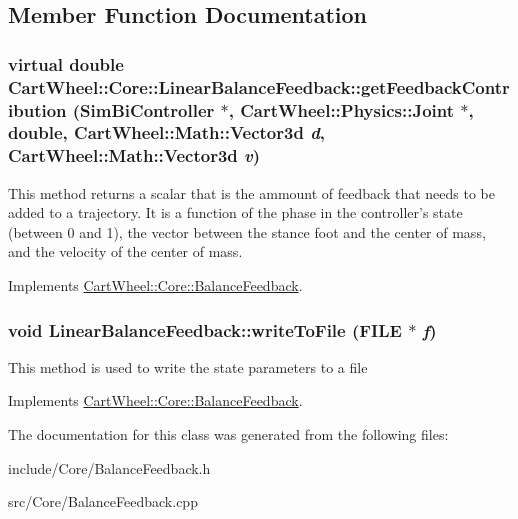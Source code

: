 \subsection{Member Function Documentation}
\hypertarget{classCartWheel_1_1Core_1_1LinearBalanceFeedback_a628981fc632cb32cde15da207f1320e5}{
\subsubsection[{getFeedbackContribution}]{\setlength{\rightskip}{0pt plus 5cm}virtual double CartWheel::Core::LinearBalanceFeedback::getFeedbackContribution ({\bf SimBiController} $\ast$, \/  {\bf CartWheel::Physics::Joint} $\ast$, \/  double, \/  {\bf CartWheel::Math::Vector3d} {\em d}, \/  {\bf CartWheel::Math::Vector3d} {\em v})}}
\label{classCartWheel_1_1Core_1_1LinearBalanceFeedback_a628981fc632cb32cde15da207f1320e5}
This method returns a scalar that is the ammount of feedback that needs to be added to a trajectory. It is a function of the phase in the controller's state (between 0 and 1), the vector between the stance foot and the center of mass, and the velocity of the center of mass. 

Implements \hyperlink{classCartWheel_1_1Core_1_1BalanceFeedback_aa76a657676cd048cecfcd7963beb35cb}{CartWheel::Core::BalanceFeedback}.

\hypertarget{classCartWheel_1_1Core_1_1LinearBalanceFeedback_a31e399f13c10db166a451229759aef8e}{
\subsubsection[{writeToFile}]{\setlength{\rightskip}{0pt plus 5cm}void LinearBalanceFeedback::writeToFile (FILE $\ast$ {\em f})}}
\label{classCartWheel_1_1Core_1_1LinearBalanceFeedback_a31e399f13c10db166a451229759aef8e}
This method is used to write the state parameters to a file 

Implements \hyperlink{classCartWheel_1_1Core_1_1BalanceFeedback}{CartWheel::Core::BalanceFeedback}.



The documentation for this class was generated from the following files:\begin{DoxyCompactItemize}
\item 
include/Core/BalanceFeedback.h\item 
src/Core/BalanceFeedback.cpp\end{DoxyCompactItemize}
